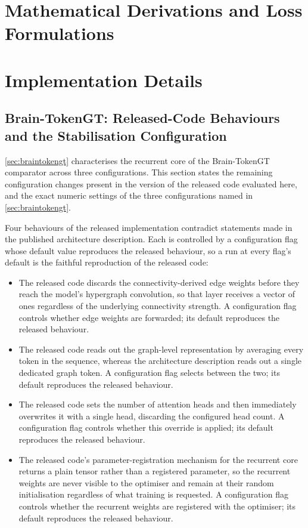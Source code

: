
\chapter{Mathematical Derivations and Loss Formulations}\label{ch:app-derivations}

\chapter{Implementation Details}\label{ch:app-implementation}

\section*{Brain-TokenGT: Released-Code Behaviours and the Stabilisation Configuration}

\autoref{sec:braintokengt} characterises the recurrent core of the Brain-TokenGT
comparator across three configurations. This section states the remaining configuration
changes present in the version of the released code evaluated here, and the exact numeric
settings of the three configurations named in \autoref{sec:braintokengt}.

Four behaviours of the released implementation contradict statements made in the published
architecture description. Each is controlled by a configuration flag whose default value
reproduces the released behaviour, so a run at every flag's default is the faithful
reproduction of the released code:

\begin{itemize}
  \item The released code discards the connectivity-derived edge weights before they reach
  the model's hypergraph convolution, so that layer receives a vector of ones regardless of
  the underlying connectivity strength. A configuration flag controls whether edge weights
  are forwarded; its default reproduces the released behaviour.
  \item The released code reads out the graph-level representation by averaging every
  token in the sequence, whereas the architecture description reads out a single dedicated
  graph token. A configuration flag selects between the two; its default reproduces the
  released behaviour.
  \item The released code sets the number of attention heads and then immediately
  overwrites it with a single head, discarding the configured head count. A configuration
  flag controls whether this override is applied; its default reproduces the released
  behaviour.
  \item The released code's parameter-registration mechanism for the recurrent core returns
  a plain tensor rather than a registered parameter, so the recurrent weights are never
  visible to the optimiser and remain at their random initialisation regardless of what
  training is requested. A configuration flag controls whether the recurrent weights are
  registered with the optimiser; its default reproduces the released behaviour.
\end{itemize}

